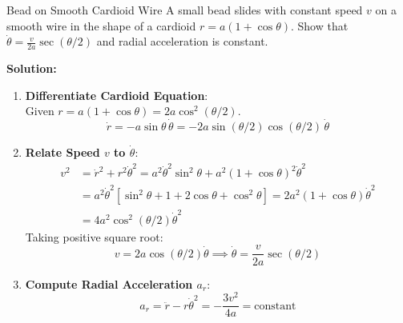 \begin{examplebox}{Bead on Smooth Cardioid Wire}
A small bead slides with constant speed $v$ on a smooth wire in the shape of a cardioid $r = a(1 + \cos\theta)$. Show that $\dot{\theta} = \frac{v}{2a}\sec(\theta/2)$ and radial acceleration is constant.

\tcblower
\textbf{Solution:}

\begin{enumerate}[leftmargin=1.5em]
    \item \textbf{Differentiate Cardioid Equation}:\\
    Given $r = a(1 + \cos\theta) = 2a \cos^2(\theta/2)$.
    \begin{equation*}
        \dot{r} = -a \sin\theta \, \dot{\theta} = -2a \sin(\theta/2) \cos(\theta/2) \, \dot{\theta}
    \end{equation*}

    \item \textbf{Relate Speed $v$ to $\dot{\theta}$}:\\
    \begin{align*}
        v^2 &= \dot{r}^2 + r^2 \dot{\theta}^2 = a^2 \dot{\theta}^2 \sin^2\theta + a^2 (1+\cos\theta)^2 \dot{\theta}^2 \\
            &= a^2 \dot{\theta}^2 [ \sin^2\theta + 1 + 2\cos\theta + \cos^2\theta ] = 2a^2 (1+\cos\theta) \dot{\theta}^2 \\
            &= 4a^2 \cos^2(\theta/2) \dot{\theta}^2
    \end{align*}
    Taking positive square root:
    \begin{equation*}
        v = 2a \cos(\theta/2) \dot{\theta} \implies \dot{\theta} = \frac{v}{2a} \sec(\theta/2)
    \end{equation*}

    \item \textbf{Compute Radial Acceleration $a_r$}:\\
    \begin{equation*}
        a_r = \ddot{r} - r \dot{\theta}^2 = -\frac{3 v^2}{4a} = \text{constant}
    \end{equation*}
\end{enumerate}
\end{examplebox}

